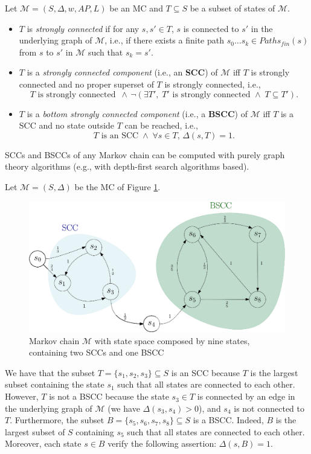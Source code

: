 \begin{definition}
Let $\mathcal{M}=(S, \Delta, w, AP, L)$ be an MC and $T \subseteq S$ be a subset of states of $\mathcal{M}$.
\begin{itemize}
  \item $T$ is \textit{strongly connected} if for any $s, s' \in T$, $s$ is connected to $s'$ in the underlying graph of $\mathcal{M}$, i.e., if there exists a finite path $s_0 \dots s_k \in Paths_{fin}(s)$ from $s$ to $s'$ in $\mathcal{M}$ such that $s_k = s'$.
  \item $T$ is a \textit{strongly connected component} (i.e., an \textbf{SCC}) of $\mathcal{M}$ iff $T$ is strongly connected and no proper superset of $T$ is strongly connected, i.e.,
  \[ T \text{ is strongly connected } \, \wedge \,
  \neg(\exists T', \; T' \text{ is strongly connected } \wedge \;
    T \subseteq T'). \]
  \item $T$ is a \textit{bottom strongly connected component} (i.e., a \textbf{BSCC}) of $\mathcal{M}$ iff
  $T$ is a SCC and no state outside $T$ can be reached, i.e.,
  \[
  T \text{ is an SCC} \; \wedge \; \forall s \in T, \,\Delta(s, T) = 1.
  \]
\end{itemize}
\end{definition}

SCCs and BSCCs of any Markov chain can be computed with
purely graph theory algorithms (e.g., with depth-first search algorithms based).

\begin{example}
Let $\mathcal{M}=(S, \Delta)$ be the MC of Figure \ref{bsccex}.
  \begin{figure}[H]
    \centering
    \includegraphics[width=0.7\linewidth]{resources/BSCC}
    \captionsetup{justification=centering}
    \caption{Markov chain $\mathcal{M}$ with state space composed by nine states, containing two SCCs and one BSCC}\label{bsccex}
  \end{figure}
\end{example}
\noindent We have that the subset $T = \{s_1, s_2, s_3\} \subseteq S$ is an SCC because $T$ is the largest subset containing the state $s_1$ such that all states are connected to each other.
However, $T$ is not a BSCC because the state $s_3 \in T$ is connected by an edge in the underlying graph of $\mathcal{M}$ (we have $\Delta(s_3, s_4) > 0$), and $s_4$ is not connected to $T$.
Furthermore, the subset $B = \{s_5, s_6, s_7, s_8\} \subseteq S$ is a BSCC. Indeed, $B$ is the largest subset of $S$ containing $s_5$ such that all states are connected to each other. Moreover, each state $s \in B$ verify the following assertion:
$\Delta(s, B)=1$.

